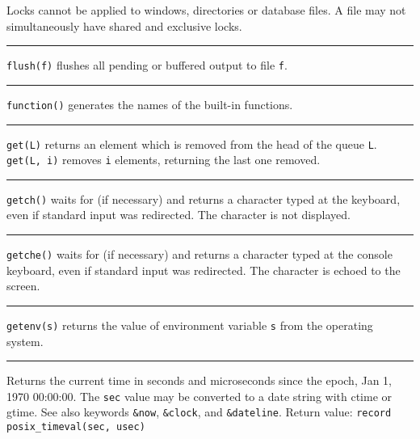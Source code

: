 Locks cannot be applied to windows, directories or database files. A
file may not simultaneously have shared and exclusive locks.

\bigskip\hrule\vspace{0.1cm}

\noindent
{}\texttt{flush(f)} flushes all pending or buffered output
to file \texttt{f}.

\bigskip\hrule\vspace{0.1cm}

\noindent
\texttt{function()} generates the names of the built-in functions.

\bigskip\hrule\vspace{0.1cm}

\noindent
\texttt{get(L)} returns an element which is removed from the head of the
queue \texttt{L}. \texttt{get(L, i)} removes \texttt{i}
elements, returning the last one removed.

\bigskip\hrule\vspace{0.1cm}

\noindent
\texttt{getch()} waits for (if necessary) and returns a character typed
at the keyboard, even if standard input was redirected.
The character is not displayed.

\bigskip\hrule\vspace{0.1cm}

\noindent
\texttt{getche()} waits for (if necessary) and returns a character typed
at the console keyboard, even if standard input was redirected. The
character is echoed to the screen.

\bigskip\hrule\vspace{0.1cm}

\noindent
\texttt{getenv(s)} returns the value of
environment variable \texttt{s}
from the operating system.

\bigskip\hrule\vspace{0.1cm}

\noindent
{}Returns the current time in seconds and microseconds
since the epoch, Jan 1, 1970 00:00:00. The \texttt{sec} value may be
converted to a date string with ctime or gtime. See also keywords
\texttt{\&now}, \texttt{\&clock}, and \texttt{\&dateline}. Return
value: \texttt{record posix\_timeval(sec, usec)} 

